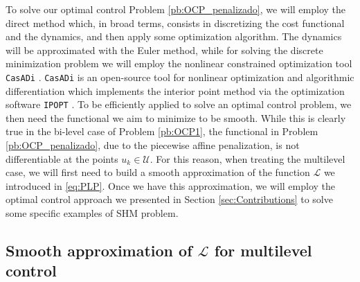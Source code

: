 \documentclass[twocolumn]{autart}    %
\begin{document}
To solve our optimal control Problem \ref{pb:OCP_penalizado}, we will employ the direct method \cite{rao2009survey} which, in broad terms, consists in discretizing the cost functional and the dynamics, and then apply some optimization algorithm. The dynamics will be approximated with the Euler method, while for solving the discrete minimization problem we will employ the nonlinear constrained optimization tool \texttt{CasADi} \cite{Andersson2019}. \texttt{CasADi} is an open-source tool for nonlinear optimization and algorithmic differentiation which implements the interior point method via the optimization software \texttt{IPOPT} \cite{wachter2006implementation}. To be efficiently applied to solve an optimal control problem, we then need the functional we aim to minimize to be smooth. While this is clearly true in the bi-level case of Problem \ref{pb:OCP1}, the functional in Problem \ref{pb:OCP_penalizado}, due to the piecewise affine penalization, is not differentiable at the points $u_k\in\mathcal U$. For this reason, when treating the multilevel case, we will first need to build a smooth approximation of the  function $\mathcal L$ we introduced in \eqref{eq:PLP}. Once we have this approximation, we will employ the optimal control approach we presented in Section \ref{sec:Contributions} to solve some specific examples of SHM problem.

\subsection{Smooth approximation of $\mathcal L$ for multilevel control}
\end{document}
